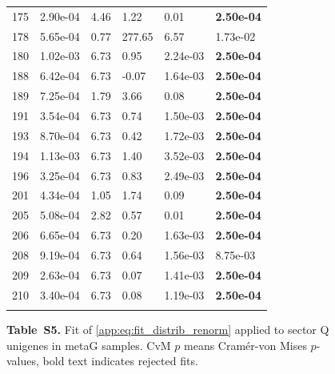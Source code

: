 \begin{figure}[htbp!]
{\begin{minipage}[t]{0.48\linewidth}
\begin{tabular}{llllll}
                    175 & 2.90e-04 & 4.46 & 1.22 & 0.01 & \textbf{2.50e-04}\\
                    178 & 5.65e-04 & 0.77 & 277.65 & 6.57 & 1.73e-02\\
                    180 & 1.02e-03 & 6.73 & 0.95 & 2.24e-03 & \textbf{2.50e-04}\\
                    188 & 6.42e-04 & 6.73 & -0.07 & 1.64e-03 & \textbf{2.50e-04}\\
                    189 & 7.25e-04 & 1.79 & 3.66 & 0.08 & \textbf{2.50e-04}\\
                    191 & 3.54e-04 & 6.73 & 0.74 & 1.50e-03 & \textbf{2.50e-04}\\
                    193 & 8.70e-04 & 6.73 & 0.42 & 1.72e-03 & \textbf{2.50e-04}\\
                    194 & 1.13e-03 & 6.73 & 1.40 & 3.52e-03 & \textbf{2.50e-04}\\
                    196 & 3.25e-04 & 6.73 & 0.83 & 2.49e-03 & \textbf{2.50e-04}\\
                    201 & 4.34e-04 & 1.05 & 1.74 & 0.09 & \textbf{2.50e-04}\\
                    205 & 5.08e-04 & 2.82 & 0.57 & 0.01 & \textbf{2.50e-04}\\
                    206 & 6.65e-04 & 6.73 & 0.20 & 1.63e-03 & \textbf{2.50e-04}\\
                    208 & 9.19e-04 & 6.73 & 0.64 & 1.56e-03 & 8.75e-03\\
                    209 & 2.63e-04 & 6.73 & 0.07 & 1.41e-03 & \textbf{2.50e-04}\\
                    210 & 3.40e-04 & 6.73 & 0.08 & 1.19e-03 & \textbf{2.50e-04}\\
                     &  &  &  &  & \\
        \bottomrule
        \end{tabular}
    \end{minipage}
    }
    \caption*{\textbf{Table~S5.} Fit of \eqref{app:eq:fit_distrib_renorm} applied to sector Q unigenes in metaG samples. CvM $p$ means Cram\'er-von Mises $p$-values, bold text indicates rejected fits.}
    \label{subtab:app:sector:metaG:Q}
\end{figure}
